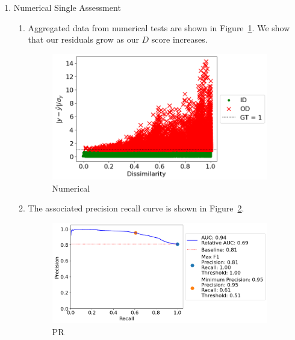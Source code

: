 \begin{enumerate}
\begin{enumerate}
    \end{enumerate}
    
    \item Numerical Single Assessment

    \begin{enumerate}

        \item Aggregated data from numerical tests are shown in Figure~\ref{fluence_single}. We show that our residuals grow as our $D$ score increases.

        \begin{figure}[H]
        \centering
        \includegraphics[width=0.95\textwidth]{figures/fluence_single.png}
        \caption{Numerical}
        \label{fluence_single}
        \end{figure}

        \item The associated precision recall curve is shown in Figure~\ref{fluence_single_pr}.

        \begin{figure}[H]
        \centering
        \includegraphics[width=0.95\textwidth]{figures/fluence_single_pr.png}
        \caption{PR}
        \label{fluence_single_pr}
        \end{figure}
    \end{enumerate}


\end{enumerate}

